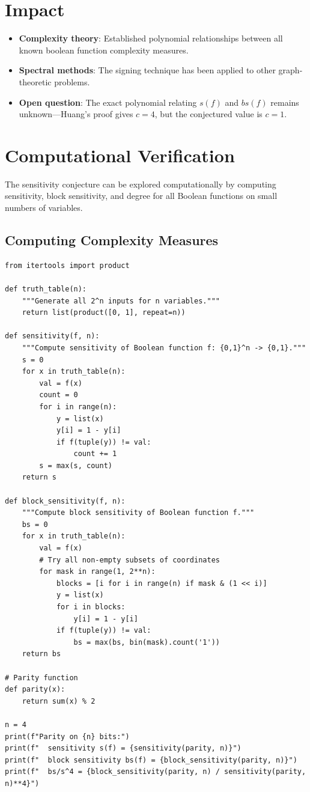 \section{Impact}
\begin{itemize}
\item \textbf{Complexity theory}: Established polynomial relationships between all known boolean function complexity measures.
\item \textbf{Spectral methods}: The signing technique has been applied to other graph-theoretic problems.
\item \textbf{Open question}: The exact polynomial relating $s(f)$ and $bs(f)$ remains unknown---Huang's proof gives $c = 4$, but the conjectured value is $c = 1$.
\end{itemize}

\section{Computational Verification}

The sensitivity conjecture can be explored computationally by computing sensitivity, block sensitivity, and degree for all Boolean functions on small numbers of variables.

\subsection{Computing Complexity Measures}

\begin{verbatim}
from itertools import product

def truth_table(n):
    """Generate all 2^n inputs for n variables."""
    return list(product([0, 1], repeat=n))

def sensitivity(f, n):
    """Compute sensitivity of Boolean function f: {0,1}^n -> {0,1}."""
    s = 0
    for x in truth_table(n):
        val = f(x)
        count = 0
        for i in range(n):
            y = list(x)
            y[i] = 1 - y[i]
            if f(tuple(y)) != val:
                count += 1
        s = max(s, count)
    return s

def block_sensitivity(f, n):
    """Compute block sensitivity of Boolean function f."""
    bs = 0
    for x in truth_table(n):
        val = f(x)
        # Try all non-empty subsets of coordinates
        for mask in range(1, 2**n):
            blocks = [i for i in range(n) if mask & (1 << i)]
            y = list(x)
            for i in blocks:
                y[i] = 1 - y[i]
            if f(tuple(y)) != val:
                bs = max(bs, bin(mask).count('1'))
    return bs

# Parity function
def parity(x):
    return sum(x) % 2

n = 4
print(f"Parity on {n} bits:")
print(f"  sensitivity s(f) = {sensitivity(parity, n)}")
print(f"  block sensitivity bs(f) = {block_sensitivity(parity, n)}")
print(f"  bs/s^4 = {block_sensitivity(parity, n) / sensitivity(parity, n)**4}")
\end{verbatim}

